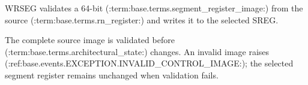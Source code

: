 WRSEG validates a 64-bit (:term:base.terms.segment_register_image:) from the source (:term:base.terms.rn_register:) and writes it to the selected SREG.

The complete source image is validated before (:term:base.terms.architectural_state:) changes. An invalid image raises
(:ref:base.events.EXCEPTION.INVALID_CONTROL_IMAGE:); the selected segment register remains unchanged when validation fails.
